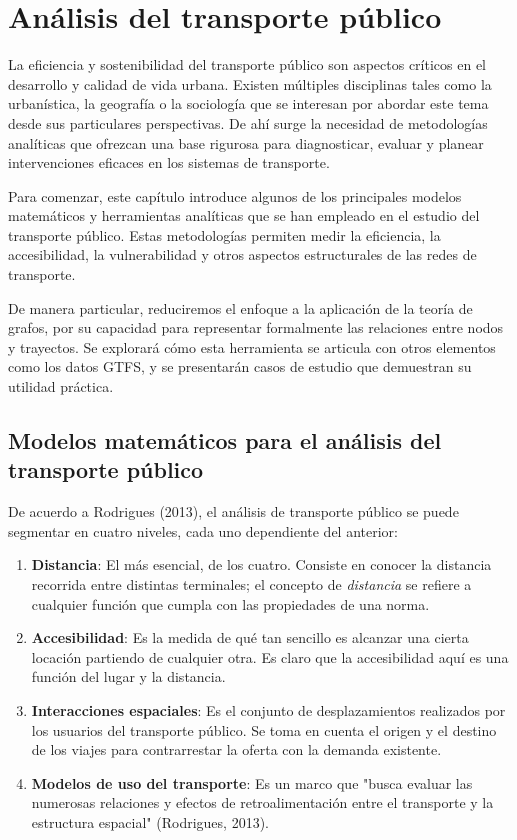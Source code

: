 \documentclass[11pt]{article}
\begin{document}
\chapter{Análisis del transporte público}

	La eficiencia y sostenibilidad del transporte público son aspectos críticos en el desarrollo y calidad de vida urbana. Existen múltiples disciplinas tales como la urbanística, la geografía o la sociología que se interesan por abordar este tema desde sus particulares perspectivas. De ahí surge la necesidad de metodologías analíticas que ofrezcan una base rigurosa para diagnosticar, evaluar y planear intervenciones eficaces en los sistemas de transporte.

	Para comenzar, este capítulo introduce algunos de los principales modelos matemáticos y herramientas analíticas que se han empleado en el estudio del transporte público. Estas metodologías permiten medir la eficiencia, la accesibilidad, la vulnerabilidad y otros aspectos estructurales de las redes de transporte.

	De manera particular, reduciremos el enfoque a la aplicación de la teoría de grafos, por su capacidad para representar formalmente las relaciones entre nodos y trayectos. Se explorará cómo esta herramienta se articula con otros elementos como los datos GTFS, y se presentarán casos de estudio que demuestran su utilidad práctica.

	\section{Modelos matemáticos para el análisis del transporte público}
		De acuerdo a Rodrigues (2013), el análisis de transporte público se puede segmentar en cuatro niveles, cada uno dependiente del anterior:
		\begin{enumerate}
			\item \textbf{Distancia}: El más esencial, de los cuatro. Consiste en conocer la distancia recorrida entre distintas terminales; el concepto de \textit{distancia} se refiere a cualquier función que cumpla con las propiedades de una norma.
			\item \textbf{Accesibilidad}: Es la medida de qué tan sencillo es alcanzar una cierta locación partiendo de cualquier otra. Es claro que la accesibilidad aquí es una función del lugar y la distancia.
			\item \textbf{Interacciones espaciales}: Es el conjunto de desplazamientos realizados por los usuarios del transporte público. Se toma en cuenta el origen y el destino de los viajes para contrarrestar la oferta con la demanda existente.
			\item \textbf{Modelos de uso del transporte}: Es un marco que "busca evaluar las numerosas relaciones y efectos de retroalimentación entre el transporte y la estructura espacial" (Rodrigues, 2013).
		\end{enumerate}
\end{document}
